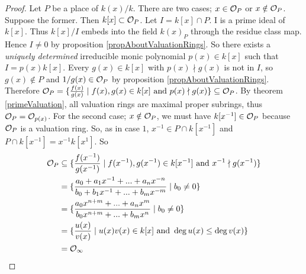 \begin{proof}
	Let $P$ be a place of $k(x)/k$. There are two cases; 
	$x \in \mathcal{O}_P$ or $x \notin \mathcal{O}_P$. 
	Suppose the former. Then $k[x] \subset \mathcal{O}_P$. Let 
	$I = k[x] \cap P$. I is a prime ideal of $k[x]$. Thus 
	$k[x]/I$ embeds into the field $k(x)_P$ through the 
	residue class map. Hence $I \neq 0$ by proposition 
	\ref{propAboutValuationRings}. So there exists a 
	\textit{uniquely determined} irreducible monic polynomial $p(x) \in k[x]$
	such that $I = p(x)k[x]$. Every $g(x) \in k[x]$ with $p(x) \nmid g(x)$ 
	is not in $I$, so $g(x) \notin P$ and $1/g(x) \in \mathcal{O}_P$ by proposition 
	\ref{propAboutValuationRings}. 
	Therefore $\mathcal{O}_P= \lbrace \frac{f(x)}{g(x)} \mid f(x), g(x) 
	\in k[x] \text{ and } p(x) \nmid g(x) \rbrace \subseteq \mathcal{O}_P$.
	By theorem \ref{primeValuation}, all valuation rings 
	are maximal proper subrings, thus $\mathcal{O}_P = \mathcal{O}_{p(x)}$.
	For the second case; $x \notin \mathcal{O}_P$, we must have
	$k[x^{-1}] \in \mathcal{O}_P$ because $\mathcal{O}_P$ is a valuation ring.
	So, as in case $1$, $x^{-1} \in P \cap k[x^{-1}] $ and 
	$P\cap k[x^{-1}]= x^{-1} k[x^{1}]$. 
	So 
	\begin{align*}
		\mathcal{O}_P 
		&\subseteq 
		\lbrace 
		\frac{f(x^{-1})}{g(x^{-1})} \mid f(x^{-1}), g(x^{-1}) \in k[x^{-1}] \text{ and } x^{-1} \nmid g(x^{-1}) 
		\rbrace \\
		&= 
		\lbrace 
		\frac{a_0 + a_1x^{-1} + ... + a_nx^{-n}}{b_0 + b_1x^{-1} + ... + b_mx^{-m}} \mid b_0 \neq 0 
		\rbrace \\
		&=
		\lbrace 
		\frac{a_0x^{n+m} + ... + a_nx^{m}}{b_0x^{n+m} + ... + b_mx^{n}} \mid b_0 \neq 0 
		\rbrace \\
		&=
		\lbrace 
		\frac{u(x)}{v(x)} \mid u(x) v(x) \in k[x] \text{ and } \deg u(x) \leq \deg v(x)
		\rbrace  \\
		&= \mathcal{O}_\infty
	\end{align*} 
\end{proof}

